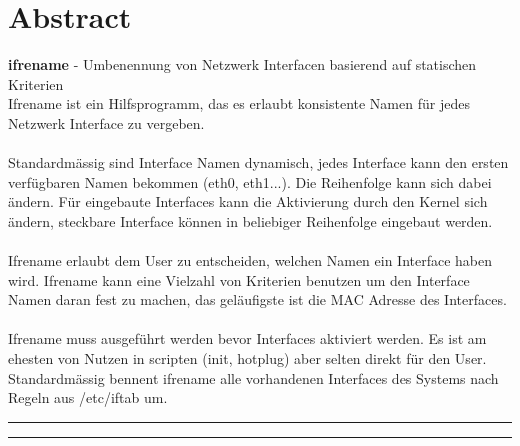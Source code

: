 

\section {Abstract}

\textbf{ifrename} - Umbenennung von Netzwerk Interfacen basierend auf statischen Kriterien\\


Ifrename ist ein Hilfsprogramm, das es erlaubt konsistente Namen für jedes Netzwerk Interface
zu vergeben.\\
\\
Standardmässig sind Interface Namen dynamisch, jedes Interface kann den ersten verfügbaren Namen
bekommen (eth0, eth1...). Die Reihenfolge kann sich dabei ändern. Für eingebaute Interfaces kann die
Aktivierung durch den Kernel sich ändern, steckbare Interface können in beliebiger Reihenfolge
eingebaut werden.\\
\\
Ifrename erlaubt dem User zu entscheiden, welchen Namen ein Interface haben wird. Ifrename kann eine
Vielzahl von Kriterien benutzen um den Interface Namen daran fest zu machen, das geläufigste ist
die MAC Adresse des Interfaces.\\
\\
Ifrename muss ausgeführt werden bevor Interfaces aktiviert werden. Es ist am ehesten von Nutzen in scripten
(init, hotplug) aber selten direkt für den User. Standardmässig bennent ifrename alle vorhandenen
Interfaces des Systems nach Regeln aus /etc/iftab um.\\

\vspace{15pt}
\hrule
{}
\hrule
\vspace{15pt}

